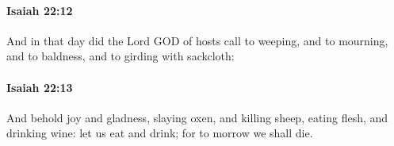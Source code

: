 		\paragraph{Isaiah 22:12} %
			\label{ISAIAH-22-12}

			And in that day did the Lord GOD of hosts call to weeping, and to mourning, and to baldness, and to girding with sackcloth:


		\paragraph{Isaiah 22:13} %
			\label{ISAIAH-22-13}

			And behold joy and gladness, slaying oxen, and killing sheep, eating flesh, and drinking wine: let us eat and drink; for to morrow we shall die.



